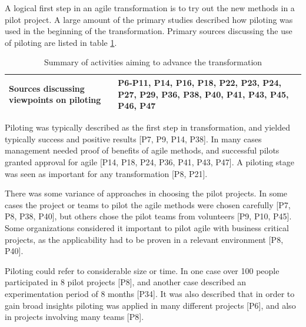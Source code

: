 
A logical first step in an agile transformation is to try out the new methods in
a pilot project. A large amount of the primary studies described how piloting
was used in the beginning of the transformation. Primary sources discussing
the use of piloting are listed in table \ref{table:transformation_piloting}. 

\begin{table}[h]
    \centering
    \begin{tabular}{ >{\raggedright\arraybackslash}p{}
                     >{\raggedright\arraybackslash}p{} }
        \toprule
        Sources discussing viewpoints on piloting   & 
                P6-P11, P14, P16, P18, P22, P23, P24, P27, P29,
                P36, P38, P40, P41, P43, P45, P46, P47  \\
        \bottomrule
    \end{tabular}
    \caption{Summary of activities aiming to advance the transformation}
    \label{table:transformation_piloting}
\end{table}

Piloting was typically described as the first step in transformation, and
yielded typically success and positive results [P7, P9, P14, P38]. In many cases
management needed proof of benefits of agile methods, and successful pilots
granted approval for agile [P14, P18, P24, P36, P41, P43, P47].
A piloting stage was seen as important for any transformation [P8, P21].


There was some variance of approaches in choosing the pilot projects.
In some cases the project or teams to pilot the agile methods were chosen
carefully [P7, P8, P38, P40], but others chose the pilot teams from volunteers
[P9, P10, P45].
Some organizations considered it important to pilot agile with business critical
projects, as the applicability had to be proven in a relevant environment [P8,
P40].

Piloting could refer to considerable size or time. In one case over 100 people
participated in 8 pilot projects [P8], and another case described an
experimentation period of 8 months [P34].
It was also described that in order to gain broad insights piloting was applied
in many different projects [P6], and also in projects involving many teams [P8].

